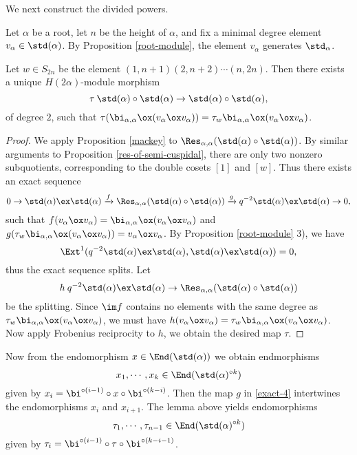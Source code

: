 We next construct the divided powers.

Let $\alpha$ be a root, let $n$ be the height of $\alpha$, and fix a minimal degree
element $v_\alpha\in\std(\alpha)$. By Proposition \ref{root-module},
the element $v_\alpha$ generates $\std_\alpha$.

\begin{lemma}\label{definition-of-tau}
    Let $w\in S_{2n}$ be the element $(1,n+1)(2,n+2)\cdots(n,2n)$.
    Then there exists a unique $H(2\alpha)$-module morphism
    \[
        \tau\:\std(\alpha)\circ\std(\alpha)
        \to\std(\alpha)\circ\std(\alpha),
    \]
    of degree $2$, such that $\tau(\bi_{\alpha,\alpha}\ox
    (v_\alpha\ox v_\alpha)) = \tau_w\bi_{\alpha,\alpha}\ox
    (v_\alpha\ox v_\alpha)$.
\end{lemma}

\begin{proof}
    We apply Proposition \ref{mackey} to 
    $\Res_{\alpha,\alpha}(\std(\alpha)\circ\std(\alpha))$. By similar arguments
    to Proposition \ref{res-of-semi-cuspidal}, there are only two
    nonzero subquotients, corresponding to the double cosets
    $[1]$ and $[w]$. Thus there exists an exact sequence
    \begin{equation}\label{exact-4}
        0\to\std(\alpha)\ex\std(\alpha)\xrightarrow{f}
        \Res_{\alpha,\alpha}(\std(\alpha)\circ\std(\alpha))
        \xrightarrow{g}q^{-2}\std(\alpha)\ex\std(\alpha)\to0,
    \end{equation}
    such that $f(v_\alpha\ox v_\alpha) = \bi_{\alpha,\alpha}
    \ox(v_\alpha\ox v_\alpha)$ and $g(\tau_w\bi_{\alpha,\alpha}
    \ox(v_\alpha\ox v_\alpha)) = v_\alpha\ox v_\alpha$.
    By Proposition \ref{root-module} 3), we have 
    \[
        \Ext^1(q^{-2}\std(\alpha)\ex\std(\alpha),
        \std(\alpha)\ex\std(\alpha)) = 0,
    \] 
    thus the exact
    sequence splits. Let 
    \[
        h\:q^{-2}\std(\alpha)\ex\std(\alpha)
        \to\Res_{\alpha,\alpha}(\std(\alpha)\circ\std(\alpha))
    \]
    be the splitting. Since $\im f$ contains no elements with
    the same degree as $\tau_w\bi_{\alpha,\alpha}
    \ox(v_\alpha\ox v_\alpha)$, we must have $h(v_\alpha\ox v_\alpha)
     = \tau_w\bi_{\alpha,\alpha}\ox(v_\alpha\ox v_\alpha)$.
    Now apply Frobenius reciprocity to $h$, we obtain the
    desired map $\tau$.
\end{proof}

Now from the endomorphism $x\in\End(\std(\alpha))$
we obtain endmorphisms 
\[
    x_1,\cdots,x_k\in\End(\std(\alpha)^{\circ k})
\]
given by $x_i = \bi^{\circ(i-1)}\circ x\circ\bi^{\circ(k-i)}$.
Then the map $g$ in \ref{exact-4} intertwines the endomorphisms
$x_i$ and $x_{i+1}$. The lemma above yields endomorphisms
\[
    \tau_1,\cdots,\tau_{n-1}\in\End(\std(\alpha)^{\circ k})
\]
given by $\tau_i = \bi^{\circ(i-1)}\circ\tau\circ\bi^{\circ(k-i-1)}$.


